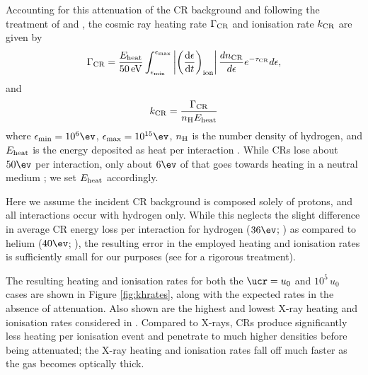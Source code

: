 Accounting for this attenuation of the CR background and following the treatment of \citet{StacyBromm2007} and \citet{InayoshiOmukai2011}, the cosmic ray heating rate $\Gamma_{\rm \small CR}$ and ionisation rate $k_{\rm \small CR}$ are given by
\begin{equation}
\Gamma_{\rm \small CR} = 
    \frac{ E_{\rm \small heat}}{50\,{\rm \small eV}} 
    \int_{\epsilon_{\rm min}}^{\epsilon_{\rm max}} 
    \left| \left( \frac{{\rm d}\epsilon} {{\rm d}t} \right)_{\rm ion} \right|
    \frac{dn_{\rm \tiny CR}}{d\epsilon} e^{-\tau_{\rm \small CR}} d\epsilon,
\end{equation}
and 
\begin{equation}
k_{\rm \small CR} = \frac{\Gamma_{\rm \small CR}}{ n_{\rm \small H} E_{\rm \small heat}}
\end{equation}
where $\epsilon_{\rm min} = 10^6\ev$, $\epsilon_{\rm max}= 10^{15}\ev$, $n_{\rm \small H}$ is the number density of hydrogen, and $E_{\rm \small heat}$ is the energy deposited as heat per interaction \citep{Schlickeiser2002}.
While CRs lose about $50\ev$ per interaction, only about $6\ev$ of that goes towards heating in a neutral medium \citep{SpitzerScott1969,ShullvanSteenberg1985}; we set $E_{\rm \small heat}$ accordingly.

Here we assume the incident CR background is composed solely of protons, and all interactions occur with hydrogen only.  
While this neglects the slight difference in average CR energy loss per interaction for hydrogen ($36\ev$; \citealt{BakkerSegre1951}) as compared to helium ($40\ev$; \citealt{WeissBernstein1956}), the resulting error in the employed heating and ionisation rates is sufficiently small for our purposes (see \citealt{JascheCiardiEnsslin2007} for a rigorous treatment). 

The resulting heating and ionisation rates for both the $\ucr=u_0$ and $10^5\,u_0$ cases are shown in Figure \ref{fig:khrates}, along with the expected rates in the absence of attenuation.
Also shown are the highest and lowest X-ray heating and ionisation rates considered in \citet{Hummeletal2015}. 
Compared to X-rays, CRs produce significantly less heating per ionisation event and penetrate to much higher densities before being attenuated; the X-ray heating and ionisation rates fall off much faster as the gas becomes optically thick.
